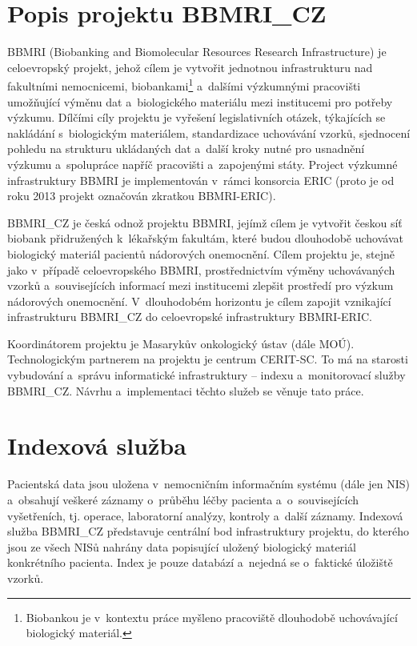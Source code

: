 \documentclass[11pt, draft, oneside]{fithesis2}
\newcommand{\ProjectName}{\mbox{BBMRI\_CZ}\xspace}
\begin{document}
\section{Popis projektu \ProjectName}\label{chapter:analysis:section:projectDescription}
BBMRI (Biobanking and Biomolecular Resources Research Infrastructure) je celoevropský projekt, jehož cílem je vytvořit jednotnou infrastrukturu nad fakultními nemocnicemi, biobankami\footnote{Biobankou je v~kontextu práce myšleno pracoviště dlouhodobě uchovávající biologický materiál.} a~dalšími výzkumnými pracovišti umožňující výměnu dat a~biologického materiálu mezi institucemi pro potřeby výzkumu. Dílčími cíly projektu je vyřešení legislativních otázek, týkajících se nakládání s~biologickým materiálem, standardizace uchovávání vzorků, sjednocení pohledu na strukturu ukládaných dat a~další kroky nutné pro usnadnění výzkumu a~spolupráce napříč pracovišti a~zapojenými státy. Project výzkumné infrastruktury BBMRI je implementován v~rámci konsorcia ERIC (proto je od roku 2013 projekt označován zkratkou BBMRI-ERIC).

\ProjectName je česká odnož projektu BBMRI, jejímž cílem je vytvořit českou síť biobank přidružených k~lékařským fakultám, které budou dlouhodobě uchovávat biologický materiál pacientů nádorových onemocnění. Cílem projektu je, stejně jako v~případě celoevropského BBMRI, prostřednictvím výměny uchovávaných vzorků a~souvisejících informací mezi institucemi zlepšit prostředí pro výzkum nádorových onemocnění. V~dlouhodobém horizontu je cílem zapojit vznikající infrastrukturu \ProjectName do celoevropské infrastruktury BBMRI-ERIC. 

Koordinátorem projektu je Masarykův onkologický ústav (dále MOÚ). Technologickým partnerem na projektu je centrum CERIT-SC. To má na starosti vybudování a~správu informatické infrastruktury – indexu a~monitorovací služby \ProjectName. Návrhu a~implementaci těchto služeb se věnuje tato práce.

\section{Indexová služba}\label{chapter:analysis:section:index}
Pacientská data jsou uložena v~nemocničním informačním systému (dále jen NIS) a~obsahují veškeré záznamy o~průběhu léčby pacienta a~o~souvisejících vyšetřeních, tj. operace, laboratorní analýzy, kontroly a~další záznamy. Indexová služba \ProjectName představuje centrální bod infrastruktury projektu, do kterého jsou ze všech NISů nahrány data popisující uložený biologický materiál konkrétního pacienta. Index je pouze databází a~nejedná se o~faktické úložiště vzorků.
\end{document}
